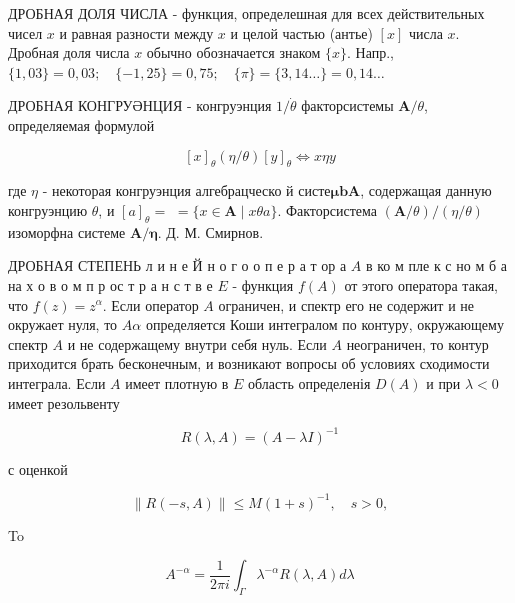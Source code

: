 \documentclass[10pt]{article}
\begin{document}
ДРОБНАЯ ДОЛЯ ЧИСЛА - функция, определешная для всех действительных чисел $x$ и равная разности между $x$ и целой частью (антье) $[x]$ числа $x$. Дробная доля числа $x$ обычно обозначается знаком $\{x\}$. Напр., $\{1,03\}=0,03 ; \quad\{-1,25\}=0,75 ; \quad\{\pi\}=\{3,14 \ldots\}=0,14 \ldots$



ДРОБНАЯ КОНГРУӘНЦИЯ - конгруэнция $1 / \dot{\theta}$ факторсистемы $\boldsymbol{A} / \theta$, определяемая формулой



\[

[x]_{\theta}(\eta / \theta)[y]_{\theta} \Leftrightarrow x \eta y

\]



где $\eta$ - некоторая конгруэнция алгебрацческо й систе$\boldsymbol{\mu} \boldsymbol{b} \boldsymbol{A}$, содержащая данную конгруэнцию $\theta$, и $[a]_{\theta}=$ $=\{x \in \boldsymbol{A} \mid x \theta a\}$. Факторсистема $(\boldsymbol{A} / \theta) /(\eta / \theta)$ изоморфна системе $\boldsymbol{A} / \boldsymbol{\eta}$. Д. М. Смирнов.



ДРОБНАЯ СТЕПЕНЬ л и н е Й н о г о о п е р а т ор а $A$ в ко м пле к с но м б а на х о в о м п р ос т р а н с т в е $E$ - функция $f(A)$ от этого оператора такая, что $f(z)=z^{\alpha}$. Если оператор $A$ ограничен, и спектр его не содержит и не окружает нуля, то $A \alpha$ определяется Коши интегралом по контуру, окружающему спектр $A$ и не содержащему внутри себя нуль. Если $A$ неограничен, то контур приходится брать бесконечным, и возникают вопросы об условиях сходимости интеграла. Если $A$ имеет плотную в $E$ область определенія $D(A)$ и при $\lambda<0$ имеет резольвенту



\[

R(\lambda, A)=(A-\lambda I)^{-1}

\]



с оценкой



\[

\|R(-s, A)\| \leqslant M(1+s)^{-1}, \quad s>0,

\]



To



\[

A^{-\alpha}=\frac{1}{2 \pi i} \int_{\Gamma} \lambda^{-\alpha} R(\lambda, A) d \lambda

\]
\end{document}
